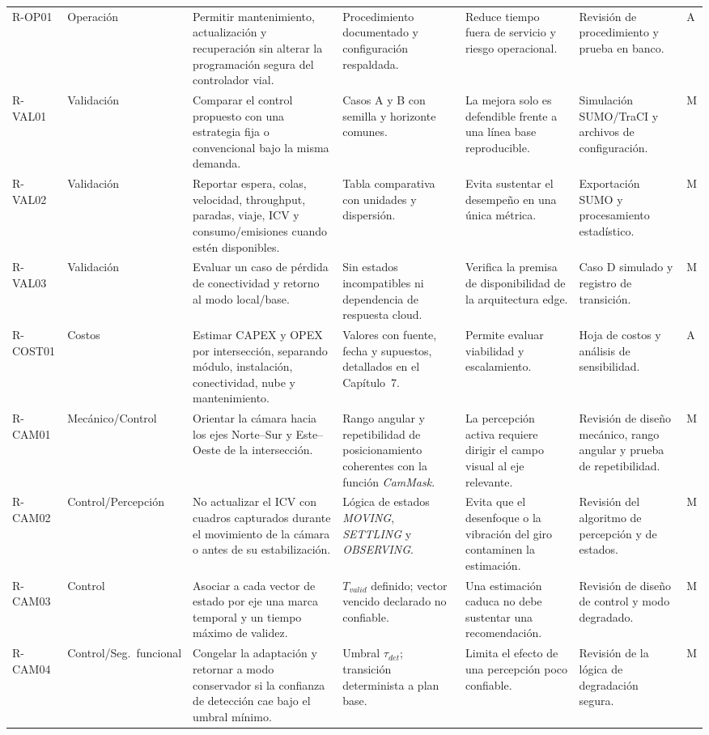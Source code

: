 \begin{landscape}
\begin{longtable}{@{}p{1.15cm}p{1.7cm}p{5.1cm}p{3.1cm}p{4.2cm}p{3.6cm}p{1.0cm}@{}}
R-OP01 & Operación & Permitir mantenimiento, actualización y recuperación sin alterar la programación segura del controlador vial. & Procedimiento documentado y configuración respaldada. & Reduce tiempo fuera de servicio y riesgo operacional. & Revisión de procedimiento y prueba en banco. & A\\
R-VAL01 & Validación & Comparar el control propuesto con una estrategia fija o convencional bajo la misma demanda. & Casos A y B con semilla y horizonte comunes. & La mejora solo es defendible frente a una línea base reproducible. & Simulación SUMO/TraCI y archivos de configuración. & M\\
R-VAL02 & Validación & Reportar espera, colas, velocidad, throughput, paradas, viaje, ICV y consumo/emisiones cuando estén disponibles. & Tabla comparativa con unidades y dispersión. & Evita sustentar el desempeño en una única métrica. & Exportación SUMO y procesamiento estadístico. & M\\
R-VAL03 & Validación & Evaluar un caso de pérdida de conectividad y retorno al modo local/base. & Sin estados incompatibles ni dependencia de respuesta cloud. & Verifica la premisa de disponibilidad de la arquitectura edge. & Caso D simulado y registro de transición. & M\\
R-COST01 & Costos & Estimar CAPEX y OPEX por intersección, separando módulo, instalación, conectividad, nube y mantenimiento. & Valores con fuente, fecha y supuestos, detallados en el Capítulo~7. & Permite evaluar viabilidad y escalamiento. & Hoja de costos y análisis de sensibilidad. & A\\
R-CAM01 & Mecánico/Control & Orientar la cámara hacia los ejes Norte--Sur y Este--Oeste de la intersección. & Rango angular y repetibilidad de posicionamiento coherentes con la función \emph{CamMask}. & La percepción activa requiere dirigir el campo visual al eje relevante. & Revisión de diseño mecánico, rango angular y prueba de repetibilidad. & M\\
R-CAM02 & Control/Percepción & No actualizar el ICV con cuadros capturados durante el movimiento de la cámara o antes de su estabilización. & Lógica de estados \emph{MOVING}, \emph{SETTLING} y \emph{OBSERVING}. & Evita que el desenfoque o la vibración del giro contaminen la estimación. & Revisión del algoritmo de percepción y de estados. & M\\
R-CAM03 & Control & Asociar a cada vector de estado por eje una marca temporal y un tiempo máximo de validez. & $T_{valid}$ definido; vector vencido declarado no confiable. & Una estimación caduca no debe sustentar una recomendación. & Revisión de diseño de control y modo degradado. & M\\
R-CAM04 & Control/Seg.\ funcional & Congelar la adaptación y retornar a modo conservador si la confianza de detección cae bajo el umbral mínimo. & Umbral $\tau_{det}$; transición determinista a plan base. & Limita el efecto de una percepción poco confiable. & Revisión de la lógica de degradación segura. & M\\
\end{longtable}
\end{landscape}

